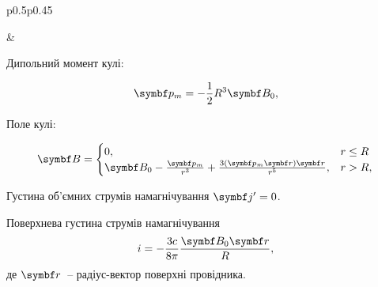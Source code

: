 \begin{center}
\begin{longtable}{p{}p{}}
		\begin{center}
			
		\end{center}
		 &

		Дипольний момент кулі:

		\[\vect{p}_m = - \frac{1}{2}R^3\Bfield_0,\]

		Поле кулі:

		\[
			\Bfield =
			\begin{cases}
				0,                                                                                          & r \le R \\
				\Bfield_0 - \frac{\vect{p}_m}{r^3} + \frac{3\left(\vect{p}_m\vect{r}\right)\vect{r} }{r^5}, & r > R,
			\end{cases}
		\]

		Густина об'ємних струмів намагнічування $\vect{j}' = 0$.

		Поверхнева густина струмів намагнічування
		\[i = -\frac{3c}{8\pi} \frac{\Bfield_0\vect{r}}{R},\]
		де $\vect{r}$~-- радіус-вектор поверхні провідника.

		\\
	\end{longtable}
\end{center}